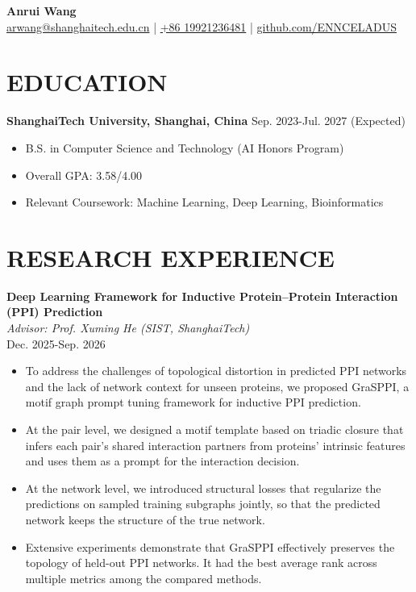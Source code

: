 \documentclass[a4paper,9pt]{extarticle}
\begin{document}
\pagestyle{fancy}
\renewcommand{\headrulewidth}{0pt}
\fancyhead{}
\thispagestyle{empty} %

\begin{flushleft}
\textbf{\LARGE Anrui Wang}\\[2pt]
\href{mailto:arwang@shanghaitech.edu.cn}{arwang@shanghaitech.edu.cn} | \href{tel:+8619921236481}{+86 19921236481} | \href{https://github.com/ENNCELADUS}{github.com/ENNCELADUS}
\end{flushleft}

\section*{EDUCATION}
\noindent \textbf{ShanghaiTech University, Shanghai, China} \hfill Sep. 2023-Jul. 2027 (Expected)
\begin{itemize}
    \item B.S. in Computer Science and Technology (AI Honors Program)
    \item Overall GPA: 3.58/4.00
    \item Relevant Coursework: Machine Learning, Deep Learning, Bioinformatics
\end{itemize}

\section*{RESEARCH EXPERIENCE}
\noindent\textbf{Deep Learning Framework for Inductive Protein--Protein Interaction (PPI) Prediction}\\
\textit{Advisor: Prof. Xuming He (SIST, ShanghaiTech)}\\
Dec. 2025-Sep. 2026
\begin{itemize}
    \item To address the challenges of topological distortion in predicted PPI networks and the lack of network context for unseen proteins, we proposed GraSPPI, a motif graph prompt tuning framework for inductive PPI prediction.
    \item At the pair level, we designed a motif template based on triadic closure that infers each pair's shared interaction partners from proteins' intrinsic features and uses them as a prompt for the interaction decision.
    \item At the network level, we introduced structural losses that regularize the predictions on sampled training subgraphs jointly, so that the predicted network keeps the structure of the true network.
    \item Extensive experiments demonstrate that GraSPPI effectively preserves the topology of held-out PPI networks. It had the best average rank across multiple metrics among the compared methods.
\end{itemize}
\end{document}
